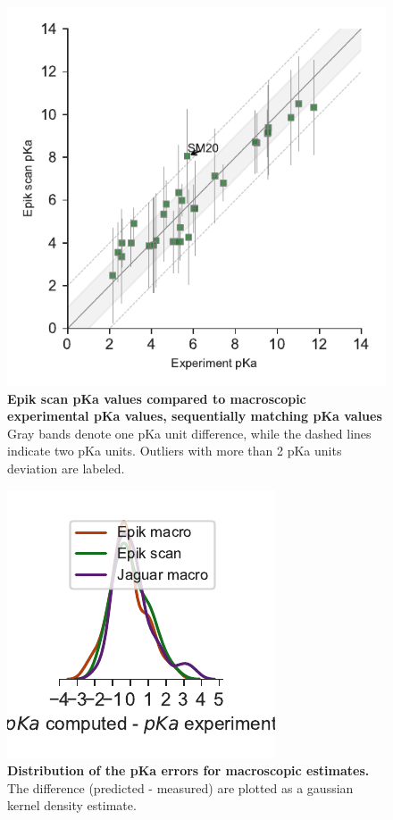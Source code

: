 \documentclass[9pt,lineno,final]{elife}
\begin{document}
\begin{figure}[hbtp]
	\centering
	\includegraphics[]{Reports/Experiment-Epik-scan-align-correlation.pdf}	
	\caption{{\bf Epik scan pKa values compared to macroscopic experimental pKa values, sequentially matching pKa values}  Gray bands denote one pKa unit difference, while the dashed lines indicate two pKa units. Outliers with more than 2 pKa units deviation are labeled.}
\end{figure}


\begin{figure}
 \centering
     \includegraphics{Reports/overview-align-distribution.pdf}
 \caption{{\bf Distribution of the pKa errors for macroscopic estimates.} The difference (predicted - measured) are plotted as a gaussian kernel density estimate.}
\end{figure}
\end{document}
